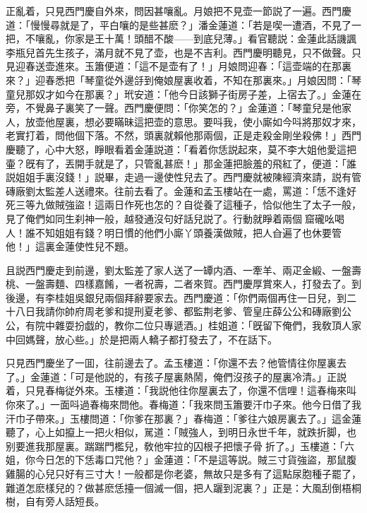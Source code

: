 正亂着，只見西門慶自外來，問因甚嚷亂。月娘把不見壶一節説了一遍。西門慶道：「慢慢尋就是了，平白嚷的是些甚麽？」潘金蓮道：「若是喫一遭酒，不見了一把，不嚷亂，你家是王十萬！頭醋不酸——到底兒薄。」看官聽説：金蓮此話譏諷李瓶兒首先生孩子，滿月就不見了壶，也是不吉利。西門慶明聽見，只不做聲。只見迎春送壶進來。玉簫便道：「這不是壶有了！」月娘問迎春：「這壶端的在那裏來？」迎春悉把「琴童從外邊㧱到俺娘屋裏收着，不知在那裏來。」月娘因問：「琴童兒那奴才如今在那裏？」玳安道：「他今日該獅子街房子差，上宿去了。」金蓮在旁，不覺鼻子裏笑了一聲。西門慶便問：「你笑怎的？」金蓮道：「琴童兒是他家人，放壶他屋裏，想必要瞞昧這把壶的意思。要呌我，使小廝如今呌將那奴才來，老實打着，問他個下落。不然，頭裏就賴他那兩個，正是走殺金剛坐殺佛！」西門慶聽了，心中大怒，睜眼看着金蓮説道：「看着你恁説起來，莫不李大姐他愛這把壷？旣有了，丟開手就是了，只管亂甚麽！」那金蓮把臉羞的飛紅了，便道：「誰説姐姐手裏沒錢！」説畢，走過一邊使性兒去了。西門慶就被陳經濟來請，説有管磚廠劉太監差人送禮來。往前去看了。金蓮和孟玉樓站在一處，罵道：「恁不逢好死三等九做賊強盜！這兩日作死也怎的？自從養了這種子，恰似他生了太子一般，見了俺們如同生刹神一般，越發通沒句好話兒説了。行動就睜着兩個𣭈窟礲吆喝人！誰不知姐姐有錢？明日慣的他們小廝丫頭養漢做賊，把人㒲遍了也休要管他！」這裏金蓮使性兒不題。

且説西門慶走到前邊，劉太監差了家人送了一罈内酒、一牽羊、兩疋金緞、一盤壽桃、一盤壽麵、四樣嘉餚，一者祝壽，二者來賀。西門慶厚賞來人，打發去了。到後邊，有李桂姐吳銀兒兩個拜辭要家去。西門慶道：「你們兩個再住一日兒，到二十八日我請你帥府周老爹和提刑夏老爹、都監荆老爹、管皇庄薛公公和磚廠劉公公，有院中雜耍扮戯的，教你二位只專遞酒。」桂姐道：「旣留下俺們，我敎頂人家中回媽聲，放心些。」於是把兩人轎子都打發去了，不在話下。

只見西門慶坐了一囬，往前邊去了。孟玉樓道：「你還不去？他管情往你屋裏去了。」金蓮道：「可是他説的，有孩子屋裏熱鬧，俺們沒孩子的屋裏冷清。」正説着，只見春梅従外來。玉樓道：「我説他往你屋裏去了，你還不信哩！這春梅來叫你來了。」一面呌過春梅來問他。春梅道：「我來問玉簫要汗巾子來。他今日借了我汗巾子帶來。」玉樓問道：「你爹在那裏？」春梅道：「爹往六娘房裏去了。」這金蓮聽了，心上如攛上一把火相似，駡道：「賊強人，到明日永世千年，就跌折脚，也别要進我那屋裏。踹踹門檻兒，敎他牢拉的囚根子把懷子骨𢱉折了。」玉樓道：「六姐，你今日怎的下恁毒口咒他？」金蓮道：「不是這等説。賊三寸貨強盜，那鼠腹雞腸的心兒只好有三寸大！一般都是你老婆，無故只是多有了這點尿胞種子罷了，難道怎麽樣兒的？做甚麽恁擡一個滅一個，把人躧到泥裏？」正是：大風刮倒梧桐樹，自有旁人話短長。

